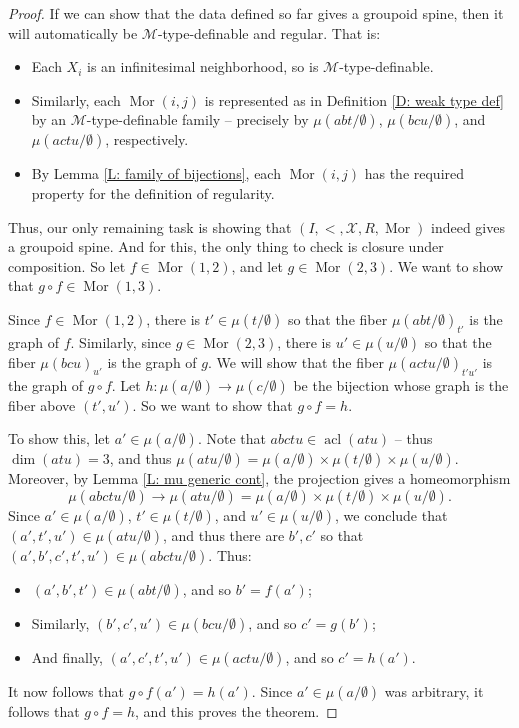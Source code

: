 \documentclass[10pt,a4paper]{amsart}
\newcommand{\acl}{\operatorname{acl}}
\begin{document}
\begin{proof}
        If we can show that the data defined so far gives a groupoid spine, then it will automatically be $\mathcal M$-type-definable and regular. That is:
        \begin{itemize}
            \item Each $X_i$ is an infinitesimal neighborhood, so is $\mathcal M$-type-definable.
            \item Similarly, each $\operatorname{Mor}(i,j)$ is represented as in Definition \ref{D: weak type def} by an $\mathcal M$-type-definable family -- precisely  by $\mu(abt/\emptyset)$, $\mu(bcu/\emptyset)$, and $\mu(actu/\emptyset)$, respectively.
            \item By Lemma \ref{L: family of bijections}, each $\operatorname{Mor}(i,j)$ has the required property for the definition of regularity.
        \end{itemize}
        Thus, our only remaining task is showing that $(I,<,\mathcal X,R,\operatorname{Mor})$ indeed gives a groupoid spine. And for this, the only thing to check is closure under composition. So let $f\in\operatorname{Mor}(1,2)$, and let $g\in\operatorname{Mor}(2,3)$. We want to show that $g\circ f\in\operatorname{Mor}(1,3)$.

        Since $f\in\operatorname{Mor}(1,2)$, there is $t'\in\mu(t/\emptyset)$ so that the fiber $\mu(abt/\emptyset)_{t'}$ is the graph of $f$. Similarly, since $g\in\operatorname{Mor}(2,3)$, there is $u'\in\mu(u/\emptyset)$ so that the fiber $\mu(bcu)_{u'}$ is the graph of $g$. We will show that the fiber $\mu(actu/\emptyset)_{t'u'}$ is the graph of $g\circ f$. Let $h:\mu(a/\emptyset)\rightarrow\mu(c/\emptyset)$ be the bijection whose graph is the fiber above $(t',u')$. So we want to show that $g\circ f=h$.

        To show this, let $a'\in\mu(a/\emptyset)$. Note that $abctu\in\acl(atu)$ -- thus $\dim(atu)=3$, and thus $\mu(atu/\emptyset)=\mu(a/\emptyset)\times\mu(t/\emptyset)\times\mu(u/\emptyset)$. Moreover, by Lemma \ref{L: mu generic cont}, the projection gives a homeomorphism $$\mu(abctu/\emptyset)\rightarrow\mu(atu/\emptyset)=\mu(a/\emptyset)\times\mu(t/\emptyset)\times\mu(u/\emptyset).$$ Since $a'\in\mu(a/\emptyset)$, $t'\in\mu(t/\emptyset)$, and $u'\in\mu(u/\emptyset)$, we conclude that $(a',t',u')\in\mu(atu/\emptyset)$, and thus there are $b',c'$ so that $(a',b',c',t',u')\in\mu(abctu/\emptyset)$. Thus:
        \begin{itemize}
            \item $(a',b',t')\in\mu(abt/\emptyset)$, and so $b'=f(a')$;
            \item Similarly, $(b',c',u')\in\mu(bcu/\emptyset)$, and so $c'=g(b')$;
            \item And finally, $(a',c',t',u')\in\mu(actu/\emptyset)$, and so $c'=h(a')$.
        \end{itemize}
        
        It now follows that $g\circ f(a')=h(a')$. Since $a'\in\mu(a/\emptyset)$ was arbitrary, it follows that $g\circ f=h$, and this proves the theorem.
        \end{proof}
\end{document}
